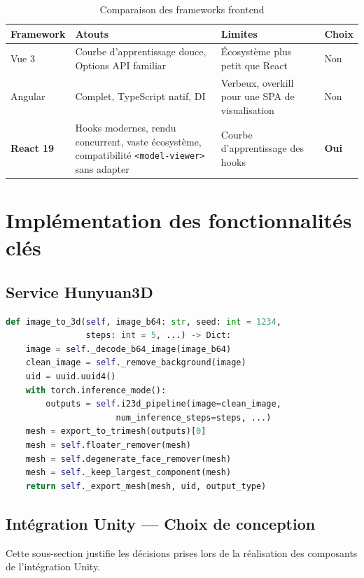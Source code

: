 \documentclass[12pt,a4paper,oneside]{report}
\newcommand{\theadrow}{\rowcolor{tekupblue!12}}
\begin{document}
\begin{table}[H]
\centering
\caption{Comparaison des frameworks frontend}
\label{tab:frontend-compare}
\begin{tabularx}{\linewidth}{@{}lXXl@{}}
\toprule
\theadrow
\textbf{Framework} & \textbf{Atouts} & \textbf{Limites} & \textbf{Choix} \\\midrule
Vue 3
  & Courbe d'apprentissage douce, Options API familiar
  & Écosystème plus petit que React
  & Non \\
Angular
  & Complet, TypeScript natif, DI
  & Verbeux, overkill pour une SPA de visualisation
  & Non \\
\textbf{React 19}
  & Hooks modernes, rendu concurrent, vaste écosystème,
    compatibilité \texttt{<model-viewer>} sans adapter
  & Courbe d'apprentissage des hooks
  & \textbf{Oui} \\
\bottomrule
\end{tabularx}
\end{table}

\section{Implémentation des fonctionnalités clés}

\subsection{Service Hunyuan3D}
\begin{lstlisting}[language=Python,
  caption={image\_to\_3d --- hunyuan3d\_service.py}]
def image_to_3d(self, image_b64: str, seed: int = 1234,
                steps: int = 5, ...) -> Dict:
    image = self._decode_b64_image(image_b64)
    clean_image = self._remove_background(image)
    uid = uuid.uuid4()
    with torch.inference_mode():
        outputs = self.i23d_pipeline(image=clean_image,
                      num_inference_steps=steps, ...)
    mesh = export_to_trimesh(outputs)[0]
    mesh = self.floater_remover(mesh)
    mesh = self.degenerate_face_remover(mesh)
    mesh = self._keep_largest_component(mesh)
    return self._export_mesh(mesh, uid, output_type)
\end{lstlisting}

\subsection{Intégration Unity --- Choix de conception}

Cette sous-section justifie les décisions prises lors de la
réalisation des composants de l'intégration Unity.
\end{document}
